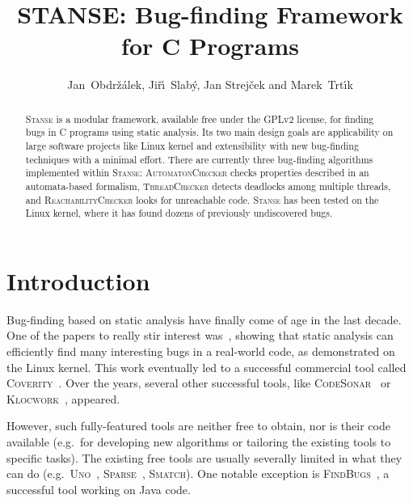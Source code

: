 \documentclass[10pt]{llncs}
\newcommand\Color[2]{\textcolor{#1}{#2}}
\newcommand{\nb}[1]{\marginpar{\scriptsize #1}}
\newcommand\todo[1]{\nb{\Color{red}{#1}}}
\newcommand{\Stanse}{\textsc{Stanse}\xspace}
\newcommand{\TC}{\textsc{ThreadChecker}\xspace}
\newcommand{\AC}{\textsc{AutomatonChecker}\xspace}
\newcommand{\RC}{\textsc{ReachabilityChecker}\xspace}
\begin{document}

\title{{STANSE}: Bug-finding Framework\\ for C Programs}
\author{Jan~Obdr\v{z}\'alek, Ji\v{r}\'\i~Slab\'y, Jan Strej\v{c}ek and Marek~Trt\'{\i}k}

\maketitle

\begin{abstract}
\Stanse is a modular framework, available free under the GPLv2 license, for finding bugs in C programs using static analysis. Its two main design goals are applicability on large software projects like Linux kernel and extensibility with new bug-finding techniques with a minimal effort. There are currently three bug-finding algorithms implemented within \Stanse: \AC checks properties described in an automata-based formalism, \TC detects deadlocks among multiple threads, and \RC looks for unreachable code. \Stanse has been tested on the Linux kernel, where it has found dozens of previously undiscovered bugs.
\end{abstract}



\section{Introduction}
\label{sec:introduction}

Bug-finding based on static analysis have finally come of age in the last decade. One of the papers to really stir interest was~\cite{ECCH00}, showing that static analysis can efficiently find many interesting bugs in a real-world code, as demonstrated on the Linux kernel. This work eventually led to a successful commercial tool called \textsc{Coverity}~\cite{coverity}. Over the years, several other successful tools, like \textsc{CodeSonar}~\cite{codesonar}\todo{Unmatched citation} or \textsc{Klocwork}~\cite{klocwork}, appeared.

However, such fully-featured tools are neither free to obtain, nor is their code available (e.g.~for developing new algorithms or tailoring the existing tools to specific tasks). The existing free tools are usually severally limited in what they can do (e.g.~\textsc{Uno}~\cite{uno}, \textsc{Sparse}~\cite{sparse}, \textsc{Smatch}\todo{Missing citation}). One notable exception is \textsc{FindBugs}~\cite{HP04,findbugs}, a successful tool working on Java code.
\end{document}
